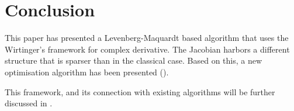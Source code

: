 \section{Conclusion}

This paper has presented a Levenberg-Maquardt based algorithm that
uses the Wirtinger's framework for complex derivative. The Jacobian
harbors a different structure that is sparser than in the classical
case. Based on this, a new optimisation algorithm has been
presented (\COH).

This framework, and its connection with existing algorithms will be
further discussed in \citet{SmirnovTasse14}.
